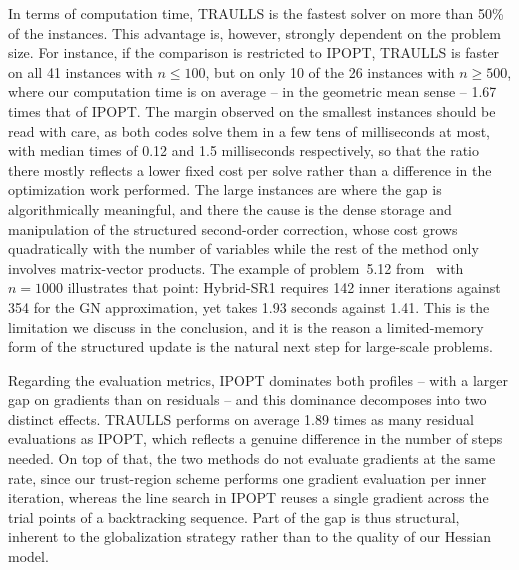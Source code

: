\documentclass{article}
\numberwithin{equation}{section}
\theoremstyle{plain}
\begin{document}
In terms of computation time, TRAULLS is the fastest solver on more than 50\% of the instances. This advantage is, however, strongly dependent on the problem size. For instance, if the comparison is restricted to IPOPT, TRAULLS is faster on all 41 instances with $n \le 100$, but on only 10 of the 26 instances with $n \ge 500$, where our computation time is on average -- in the geometric mean sense -- 1.67 times that of IPOPT. The margin observed on the smallest instances should be read with care, as both codes solve them in a few tens of milliseconds at most, with median times of 0.12 and 1.5 milliseconds respectively, so that the ratio there mostly reflects a lower fixed cost per solve rather than a difference in the optimization work performed. The large instances are where the gap is algorithmically meaningful, and there the cause is the dense storage and manipulation of the structured second-order correction, whose cost grows quadratically with the number of variables while the rest of the method only involves matrix-vector products. The example of problem~5.12 from~\cite{lucksanvlcek:1999} with $n=1000$ illustrates that point: Hybrid-SR1 requires 142 inner iterations against 354 for the GN approximation, yet takes 1.93 seconds against 1.41. This is the limitation we discuss in the conclusion, and it is the reason a limited-memory form of the structured update is the natural next step for large-scale problems.

Regarding the evaluation metrics, IPOPT dominates both profiles -- with a larger gap on gradients than on residuals -- and this dominance decomposes into two distinct effects. TRAULLS performs on average 1.89 times as many residual evaluations as IPOPT, which reflects a genuine difference in the number of steps needed. On top of that, the two methods do not evaluate gradients at the same rate, since our trust-region scheme performs one gradient evaluation per inner iteration, whereas the line search in IPOPT reuses a single gradient across the trial points of a backtracking sequence. Part of the gap is thus structural, inherent to the globalization strategy rather than to the quality of our Hessian model.
\end{document}
